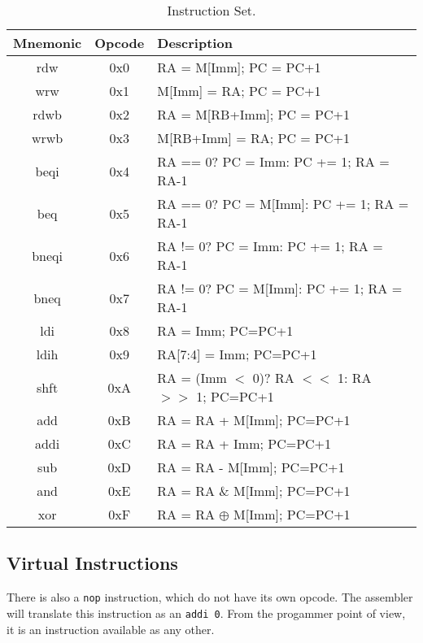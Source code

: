 \begin{table}[!htbp]
  \centering
    \begin{tabular}{|c|c|p{8cm}|}
    \hline 
    {\bf Mnemonic} & {\bf Opcode} & {\bf Description} \\
    \hline \hline 
    rdw   & 0x0 & RA = M[Imm]; PC = PC+1\\
    \hline
    wrw   & 0x1 & M[Imm] = RA; PC = PC+1\\
    \hline
    rdwb  & 0x2 & RA = M[RB+Imm]; PC = PC+1\\
    \hline
    wrwb  & 0x3 & M[RB+Imm] = RA; PC = PC+1\\
    \hline
    beqi  & 0x4 & RA == 0? PC = Imm: PC += 1; RA = RA-1\\
    \hline
    beq   & 0x5 & RA == 0? PC = M[Imm]: PC += 1; RA = RA-1\\
    \hline
    bneqi & 0x6 & RA != 0? PC = Imm: PC += 1; RA = RA-1\\
    \hline
    bneq  & 0x7 & RA != 0? PC = M[Imm]: PC += 1; RA = RA-1\\
    \hline
    ldi   & 0x8 & RA = Imm; PC=PC+1\\
    \hline
    ldih  & 0x9 & RA[7:4] = Imm; PC=PC+1\\
    \hline
    shft  & 0xA & RA = (Imm $<$ 0)? RA $<<$ 1: RA $>>$ 1; PC=PC+1\\
    \hline
    add   & 0xB & RA = RA + M[Imm]; PC=PC+1\\
    \hline
    addi  & 0xC & RA = RA + Imm; PC=PC+1\\
    \hline
    sub   & 0xD & RA = RA - M[Imm]; PC=PC+1\\
    \hline
    and   & 0xE & RA = RA \& M[Imm]; PC=PC+1\\
    \hline
    xor   & 0xF & RA = RA $\oplus$ M[Imm]; PC=PC+1\\
    \hline
    
    \end{tabular}
  \caption{Instruction Set.}
  \label{tab:isa}
\end{table}

\subsection{Virtual Instructions}

There is also a {\tt nop} instruction, which do not have its own
opcode. The assembler will translate this instruction as an {\tt addi
  0}. From the progammer point of view, it is an instruction available
as any other.

